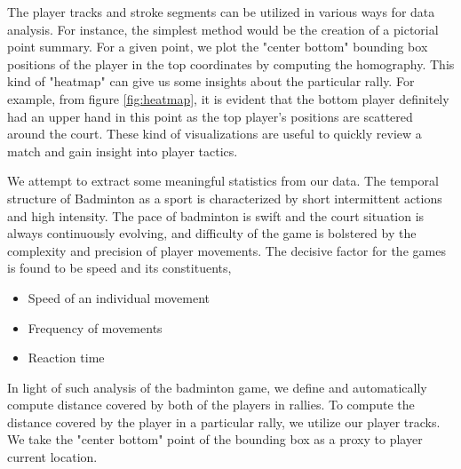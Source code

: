 \documentclass[runningheads,a4paper]{llncs}
\begin{document}
The player tracks and stroke segments can be utilized in various ways for data analysis. For instance, the simplest method would be the creation of a pictorial point summary. For a given point, we plot the "center bottom" bounding box positions of the player in the top coordinates by computing the homography. This kind of "heatmap" can give us some insights about the particular rally. For example, from figure \ref{fig:heatmap}, it is evident that the bottom player definitely had an upper hand in this point as the top player's positions are scattered around the court. These kind of visualizations are useful to quickly review a match and gain insight into player tactics. \par
We attempt to extract some meaningful statistics from our data. The temporal structure of Badminton as a sport is characterized by short intermittent actions and high intensity. The pace of badminton is swift and the court situation is always continuously evolving, and difficulty of the game is bolstered by the complexity and precision of player movements. The decisive factor for the games is found to be speed and its constituents,
\begin{itemize}
    \item Speed of an individual movement
    \item Frequency of movements
    \item Reaction time
\end{itemize}

In light of such analysis of the badminton game, we define and automatically compute distance covered by both of the players in rallies. To compute the distance covered by the player in a particular rally, we utilize our player tracks. We take the "center bottom" point of the bounding box as a proxy to player current location.
\end{document}
